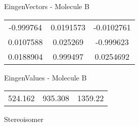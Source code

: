 \begin{multicols}{2}
\begin{center}
\vtab
 EingenVectors - Molecule B     \\
\vtab
\begin{tabular}{|c c c|}
-0.999764	 & 	0.0191573	 & 	-0.0102761	 \\
0.0107588	 & 	0.025269	 & 	-0.999623	 \\
0.0188904	 & 	0.999497	 & 	0.0254692
\end{tabular}

\vtab
 EingenValues - Molecule B     \\
\vtab
\begin{tabular}{|c c c|}
524.162	 & 	935.308	 & 	1359.22	 \\
\end{tabular}

\end{center}
\end{multicols}
\begin{center}
\vtab
\vtab
\textcolor{NavyBlue}{\Large Stereoisomer}
\end{center}

 \newpage

